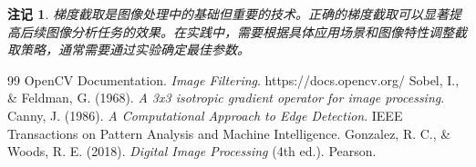 \documentclass{article}
\newtheorem{remark}{注记}[section]
\begin{document}
\begin{remark}
梯度截取是图像处理中的基础但重要的技术。正确的梯度截取可以显著提高后续图像分析任务的效果。在实践中，需要根据具体应用场景和图像特性调整截取策略，通常需要通过实验确定最佳参数。
\end{remark}

\begin{thebibliography}{99}
 OpenCV Documentation. \textit{Image Filtering}. https://docs.opencv.org/
 Sobel, I., \& Feldman, G. (1968). \textit{A 3x3 isotropic gradient operator for image processing}.
 Canny, J. (1986). \textit{A Computational Approach to Edge Detection}. IEEE Transactions on Pattern Analysis and Machine Intelligence.
 Gonzalez, R. C., \& Woods, R. E. (2018). \textit{Digital Image Processing} (4th ed.). Pearson.
\end{thebibliography}
\end{document}
